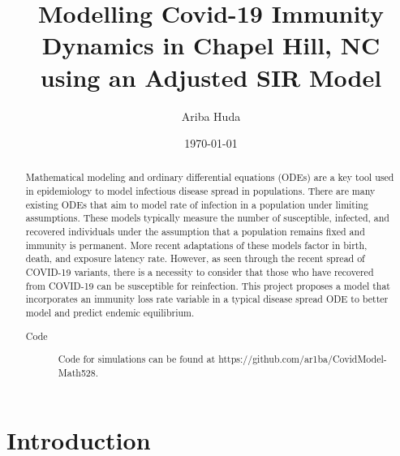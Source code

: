 \documentclass[%
 reprint,
]{revtex4-2}
\begin{document}

\title{Modelling Covid-19 Immunity Dynamics in Chapel Hill, NC \\ using an Adjusted SIR Model}%


\author{Ariba Huda}
%


\date{\today}%

\begin{abstract}

Mathematical modeling and ordinary differential equations (ODEs) are a key tool used in epidemiology to model infectious disease spread in populations. There are many existing ODEs that aim to model rate of infection in a population under limiting assumptions. These models typically measure the number of susceptible, infected, and recovered individuals under the assumption that a population remains fixed and immunity is permanent. More recent adaptations of these models factor in birth, death, and exposure latency rate. However, as seen through the recent spread of COVID-19 variants, there is a necessity to consider that those who have recovered from COVID-19 can be susceptible for reinfection. This project proposes a model that incorporates an immunity loss rate variable in a typical disease spread ODE to better model and predict endemic equilibrium.

\begin{description}
\item[Code]
Code for simulations can be found at https://github.com/ar1ba/CovidModel-Math528.
 
\end{description}
\end{abstract}

\maketitle


\section{\label{sec:level1}Introduction\protect\\}
\end{document}

